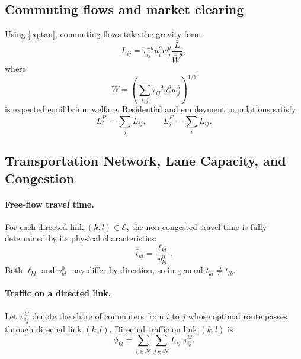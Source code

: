 \documentclass[12pt]{article}
\begin{document}
	\subsection{Commuting flows and market clearing}
	Using \eqref{eq:tau}, commuting flows take the gravity form
	\begin{equation}
		L_{ij}
		=
		\tau_{ij}^{-\theta} u_i^\theta w_j^\theta
		\frac{\bar L}{\bar W^\theta},
		\label{eq:gravity}
	\end{equation}
	where
	\begin{equation}
		\bar W
		=
		\left(
		\sum_{i,j}\tau_{ij}^{-\theta}u_i^\theta w_j^\theta
		\right)^{1/\theta}
		\label{eq:welfare}
	\end{equation}
	is expected equilibrium welfare. Residential and employment populations satisfy
	\begin{equation}
		L_i^R=\sum_j L_{ij}, \qquad L_j^F=\sum_i L_{ij}.
		\label{eq:marketclearing}
	\end{equation}
	
	\subsection{Transportation Network, Lane Capacity, and Congestion}

	\paragraph{Free-flow travel time.}
	For each directed link $(k,l)\in\mathcal E$, the non-congested travel time is fully determined by its physical characteristics:
	\begin{equation}
		\bar{t}_{kl} = \frac{\ell_{kl}}{v^0_{kl}}.
		\label{eq:tbar}
	\end{equation}
	Both $\ell_{kl}$ and $v^0_{kl}$ may differ by direction, so in general $\bar{t}_{kl}\neq\bar{t}_{lk}$.

	\paragraph{Traffic on a directed link.}
	Let $\pi^{kl}_{ij}$ denote the share of commuters from $i$ to $j$ whose optimal route passes through directed link $(k,l)$. Directed traffic on link $(k,l)$ is
	\begin{equation}
		\phi_{kl}
		=
		\sum_{i\in\mathcal N}\sum_{j\in\mathcal N}
		L_{ij}\,\pi^{kl}_{ij}.
		\label{eq:traffic_kl}
	\end{equation}
\end{document}
